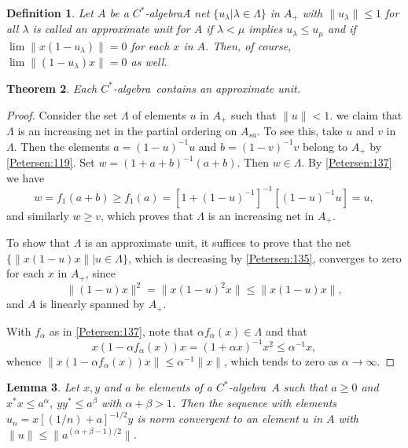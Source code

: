 \documentclass{book}
\newtheorem{definition}{Definition}[section]
\newtheorem{lemma}[definition]{Lemma}
\newtheorem{theorem}[definition]{Theorem}
\def\cstar{\(C^*\)-algebra}
\begin{document}
\begin{definition}
  Let \(A\) be a \cstar\. A net \(\{u_\lambda| \lambda\in \Lambda\}\) in \(A_+\) with \(\|u_\lambda\|\leq 1\) for all \(\lambda\)
  is called an \textnormal{approximate unit} for \(A\) if \(\lambda<\mu\) implies \(u_\lambda\leq u_\mu\)
  and if \(\lim\|x(1-u_\lambda)\|=0\) for each \(x\) in \(A\).
  Then, of course, \(\lim\|(1-u_\lambda)x\|=0\) as well.
\end{definition}
\begin{theorem}\label{Petersen:142}
  Each \cstar\ contains an approximate unit.
\end{theorem}
\begin{proof}
  Consider the set \(\Lambda\) of elements \(u\) in \(A_+\) such that \(\|u\|< 1\).
  we claim that \(\Lambda\) is an increasing net in the partial ordering on \(A_{sa}\).
  To see this, take \(u\) and \(v\) in \(\Lambda\).
  Then the elements \(a={(1-u)}^{-1}u\) and \(b={(1-v)}^{-1}v\)
  belong to \(A_+\) by \ref{Petersen:119}.
  Set \(w={(1+a+b)}^{-1}(a+b)\). Then \(w\in \Lambda\). By \ref{Petersen:137} we have
  \[
    w=f_1(a+b)\geq f_1(a)={[1+{(1-u)}^{-1}]}^{-1}[{(1-u)}^{-1}u]=u,
  \]
  and similarly \(w\geq v\), which proves that \(\Lambda\) is an increasing net in \(A_+\).\par
  To show that \(\Lambda\) is an approximate unit, it suffices to prove that the net 
  \(\{\|x(1-u)x\| | u\in\Lambda\}\), which is decreasing by \ref{Petersen:135}, converges to zero for each \(x\) in \(A_+\), since
  \[
    \|(1-u)x\|^2=\|x(1-u)^2 x\|\leq\|x(1-u)x\|,
  \]
  and \(A\) is linearly spanned by \(A_+\).\par
  With \(f_\alpha\) as in \ref{Petersen:137}, note that \(\alpha f_\alpha(x)\in\Lambda\) and that
  \[
    x(1-\alpha f_\alpha(x))x=(1+\alpha x)^{-1}x^2\leq \alpha^{-1}x,
  \]
  whence \(\|x(1-\alpha f_\alpha(x))x\|\leq\alpha^{-1}\|x\|\), which tends to zero as \(\alpha\rightarrow\infty\).
\end{proof}
\begin{lemma}\label{Petersen:144}
  Let \(x,y\) and \(a\) be elements of a \cstar\ \(A\) such that \(a\geq 0\) and \(x^* x\leq a^\alpha\), \(y y^*\leq a^\beta\)
  with \(\alpha+\beta>1\). Then the sequence with elements \(u_n=x{[(1/n)+a]}^{-1/2}y\) is norm
  convergent to an element \(u\) in \(A\) with \(\|u\|\leq\|a^{(\alpha+\beta-1)/2}\|\).
\end{lemma}
\end{document}
